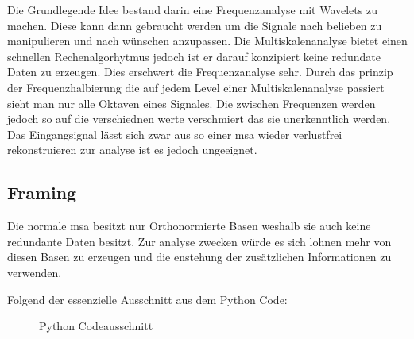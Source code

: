 
Die Grundlegende Idee bestand darin eine Frequenzanalyse mit Wavelets zu machen. Diese kann dann gebraucht werden um die Signale nach belieben zu manipulieren und nach wünschen anzupassen. Die Multiskalenanalyse bietet einen schnellen Rechenalgorhytmus jedoch ist er darauf konzipiert keine redundate Daten zu erzeugen. Dies erschwert die Frequenzanalyse sehr. Durch das prinzip der Frequenzhalbierung die auf jedem Level einer Multiskalenanalyse passiert sieht man nur alle Oktaven eines Signales. Die zwischen Frequenzen werden jedoch so auf die verschiednen werte verschmiert das sie unerkenntlich werden. Das Eingangsignal lässt sich zwar aus so einer msa wieder verlustfrei rekonstruieren zur analyse ist es jedoch ungeeignet.


\subsection{Framing}
Die normale msa besitzt nur Orthonormierte Basen weshalb sie auch keine redundante Daten besitzt. Zur analyse zwecken würde es sich lohnen mehr von diesen Basen zu erzeugen und die enstehung der zusätzlichen Informationen zu verwenden. 







Folgend der essenzielle Ausschnitt aus dem Python Code:
\begin{figure}[!ht]
	\centering
	
	\caption{Python Codeausschnitt}
	\label{fig:python-code}
\end{figure}